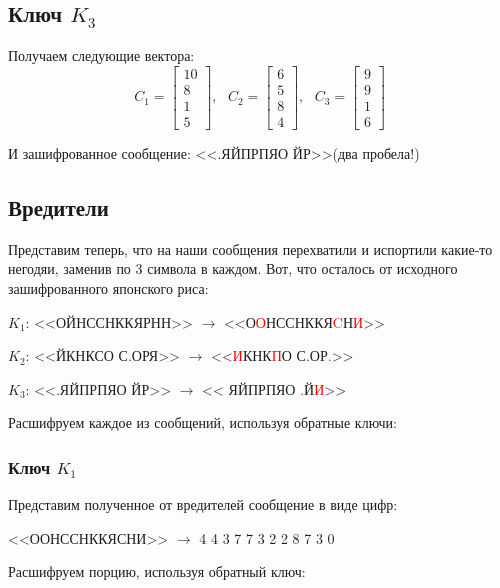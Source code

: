 \documentclass[a4paper,hidelinks,14pt]{extarticle}
\begin{document}
	\subsection{Ключ $K_3$}
	Получаем следующие вектора:
	$$
	C_1 = \begin{bmatrix}
		10 \\
		8 \\
		1 \\
		5
	\end{bmatrix}, \text{ }
	C_2 = \begin{bmatrix}
		6 \\
		5 \\
		8 \\
		4
	\end{bmatrix}, \text{ }
	C_3 = \begin{bmatrix}
		9 \\
		9 \\
		1 \\
		6
	\end{bmatrix}
	$$
	
	И зашифрованное сообщение: <<.ЯЙПРПЯО  ЙР>>(два пробела!)
	
	\subsection{Вредители}
	
	Представим теперь, что на наши сообщения перехватили и испортили какие-то негодяи, заменив по 3 символа в каждом. Вот, что осталось от исходного зашифрованного японского риса:
	
	$K_1$: <<ОЙНССНККЯРНН>> $\rightarrow$ <<О\textcolor{red}{О}НССНККЯ\textcolor{red}{C}Н\textcolor{red}{И}>> 
	
	$K_2$: <<ЙКНКСО С.ОРЯ>> $\rightarrow$ <<\textcolor{red}{И}КНК\textcolor{red}{П}О С.ОР\textcolor{red}{.}>>
	
	$K_3$: <<.ЯЙПРПЯО  ЙР>> $\rightarrow$ << ЯЙПРПЯО \textcolor{red}{.}Й\textcolor{red}{И}>>
	
	Расшифруем каждое из сообщений, используя обратные ключи:
	\subsubsection{Ключ $K_1$}
	Представим полученное от вредителей сообщение в виде цифр:
	
	<<ООНССНККЯСНИ>> $\rightarrow$ 4 4 3 7 7 3 2 2 8 7 3 0
	
	Расшифруем порцию, используя обратный ключ:
	
\end{document}
